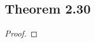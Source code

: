 \documentclass[../../main.tex]{subfiles}
\begin{document}
\subsection{Theorem 2.30}
\begin{wts}

\end{wts}
\begin{proof}

\end{proof}
\end{document}

